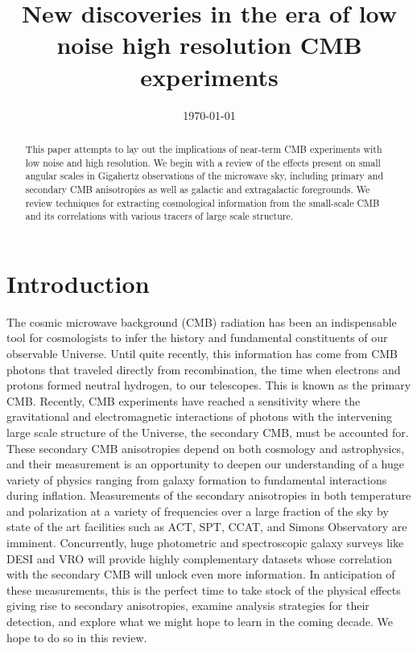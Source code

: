\documentclass[aps,nofootinbib,groupedaddress]{revtex4}
\begin{document}
\title{New discoveries in the era of low noise high resolution CMB experiments}



\date{\today}

\begin{abstract}
This paper attempts to lay out the implications of near-term CMB experiments with low noise and high resolution. We begin with a review of the effects present on small angular scales in Gigahertz observations of the microwave sky, including primary and secondary CMB anisotropies as well as galactic and extragalactic foregrounds. We review techniques for extracting cosmological information from the small-scale CMB and its correlations with various tracers of large scale structure.
\end{abstract}

\maketitle

\tableofcontents



\section{Introduction}

The cosmic microwave background (CMB) radiation has been an indispensable tool for cosmologists to infer the history and fundamental constituents of our observable Universe. Until quite recently, this information has come from CMB photons that traveled directly from recombination, the time when electrons and protons formed neutral hydrogen, to our telescopes. This is known as the primary CMB. Recently, CMB experiments have reached a sensitivity where the gravitational and electromagnetic interactions of photons with the intervening large scale structure of the Universe, the secondary CMB, must be accounted for. These secondary CMB anisotropies depend on both cosmology and astrophysics, and their measurement is an opportunity to deepen our understanding of a huge variety of physics ranging from galaxy formation to fundamental interactions during inflation. Measurements of the secondary anisotropies in both temperature and polarization at a variety of frequencies over a large fraction of the sky by state of the art facilities such as ACT, SPT, CCAT, and Simons Observatory are imminent. Concurrently, huge photometric and spectroscopic galaxy surveys like DESI and VRO will provide highly complementary datasets whose correlation with the secondary CMB will unlock even more information. In anticipation of these measurements, this is the perfect time to take stock of the physical effects giving rise to secondary anisotropies, examine analysis strategies for their detection, and explore what we might hope to learn in the coming decade. We hope to do so in this review.
\end{document}
